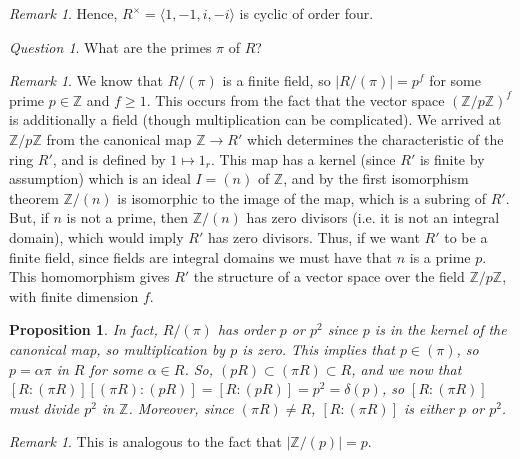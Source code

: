 \documentclass[12pt]{article}
\newtheorem{prop}[thm]{Proposition}
\theoremstyle{definition}
\theoremstyle{remark}
\newtheorem{rmk}[thm]{Remark}
\newtheorem*{qst}{Question}
\numberwithin{equation}{section}
\newcommand\Z{\mathbb Z}    %
\begin{document}
\vspace{15pt}

\begin{rmk}
        Hence, $R^{\times} = \langle 1,-1,i,-i \rangle$ is cyclic of order four.
\end{rmk}

\vspace{15pt}


\begin{qst} 
        What are the primes $\pi$ of $R$?
\end{qst}

\vspace{15pt}

\begin{rmk}
        We know that $R/(\pi)$ is a finite field, so $|R/(\pi)| = p^f$ for some prime $p \in \Z$ and $f \geq 1$. This occurs from the fact that the vector space $(\Z/p\Z)^f$ is additionally a field (though multiplication can be complicated). We arrived at $\Z/p\Z$ from the canonical map $\Z\rightarrow R'$ which determines the characteristic of the ring $R'$, and is defined by $1\mapsto 1_r$. This map has a kernel (since $R'$ is finite by assumption) which is an ideal $I = (n)$ of $\Z$, and by the first isomorphism theorem $\Z/(n)$ is isomorphic to the image of the map, which is a subring of $R'$. But, if $n$ is not a prime, then $\Z/(n)$ has zero divisors (i.e. it is not an integral domain), which would imply $R'$ has zero divisors. Thus, if we want $R'$ to be a finite field, since fields are integral domains we must have that $n$ is a prime $p$. This homomorphism gives $R'$ the structure of a vector space over the field $\Z/p\Z$, with finite dimension $f$.
\end{rmk}


\vspace{15pt}

\begin{prop}
        In fact, $R/(\pi)$ has order $p$ or $p^2$ since $p$ is in the kernel of the canonical map, so multiplication by $p$ is zero. This implies that $p \in (\pi)$, so $p = \alpha \pi$ in $R$ for some $\alpha \in R$. So, $(pR) \subset (\pi R) \subset R$, and we now that $[R:(\pi R)][(\pi R):(pR)]=[R:(pR)] = p^2 = \delta(p)$, so $[R:(\pi R)]$ must divide $p^2$ in $\Z$. Moreover, since $(\pi R) \neq R$, $[R:(\pi R)]$ is either $p$ or $p^2$.
\end{prop}

\vspace{15pt}

\begin{rmk}
        This is analogous to the fact that $|\Z/(p)| = p$.
\end{rmk}
\end{document}
